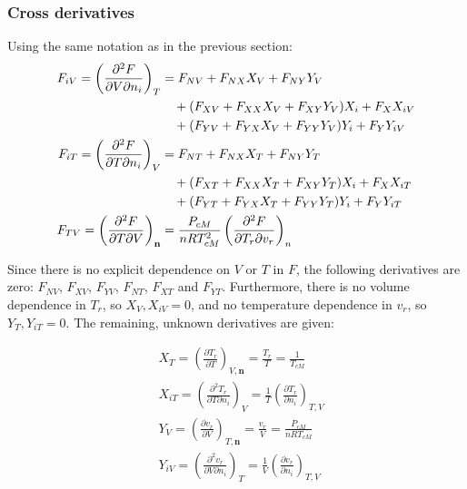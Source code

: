 \documentclass[english]{../thermomemo/thermomemo}
\numberwithin{equation}{section}
\newcommand*{\pder}[2]{\left(\frac{\partial #1}{\partial #2}\right)}
\newcommand*{\pdcross}[3]{\left(\frac{\partial^2 #1}{\partial #2 \partial #3}\right)}
\begin{document}
\subsubsection*{Cross derivatives}
Using the same notation as in the previous section:
\begin{align}
  \phantom{F_{iV} = \pdcross{F}{V}{n_i}_{T}}
  \label{eq:F_iV}
  & \begin{aligned}
    \mathllap{F_{iV} = \pdcross{F}{V}{n_i}_{T}}
    & =  F_{NV} + F_{NX}X_{V} + F_{NY}Y_{V}  \\
    & \quad + (F_{X V} + F_{XX} X_{V} + F_{XY} Y_{V}) X_{i} + F_{X}X_{iV} \\
    & \quad + (F_{Y V} + F_{YX} X_{V} + F_{YY} Y_{V}) Y_{i} + F_{Y}Y_{iV}
  \end{aligned} \\
  \label{eq:F_iT}
  & \begin{aligned}
    \mathllap{F_{iT} = \pdcross{F}{T}{n_i}_{V}}
    & =  F_{NT} + F_{NX}X_{T} + F_{NY}Y_{T}  \\
    & \quad + (F_{X T} + F_{XX} X_{T} + F_{XY} Y_{T}) X_{i} + F_{X}X_{iT} \\
	& \quad + (F_{Y T} + F_{YX} X_{T} + F_{YY} Y_{T}) Y_{i} + F_{Y}Y_{iT}
  \end{aligned} \\
  \label{F_TV}
  & \begin{aligned}
    \mathllap{F_{TV} = \pdcross{F}{T}{V}_\textbf{n}}
    & = \frac{P_{cM}}{n R T_{cM}^2} \pdcross{F}{T_r}{v_r}_{n} 
  \end{aligned}
\end{align}

Since there is no explicit dependence on $V$ or $T$ in $F$, the following derivatives are zero: $F_{NV}$, $F_{X V}$, $F_{Y V}$, $F_{NT}$, $F_{X T}$ and $F_{Y T}$. Furthermore, there is no volume dependence in $T_r$, so $X_V , X_{iV} = 0$, and no temperature dependence in $v_r$, so $Y_T , Y_{iT} = 0$. The remaining, unknown derivatives are given:

\begin{align}
& X_T = \pder{T_r}{T}_{V,\textbf{n}} = \frac{T_r}{T} = \frac{1}{T_{cM}}\\
& X_{iT} = \pdcross{T_r}{T}{n_i}_{V} = \frac{1}{T} \pder{T_r}{n_i}_{T,V} \\
& Y_V = \pder{v_r}{V}_{T,\textbf{n}} = \frac{v_r}{V} = \frac{P_{cM}}{n R T_{cM}}\\
& Y_{iV} = \pdcross{v_r}{V}{n_i}_{T} = \frac{1}{V} \pder{v_r}{n_i}_{T,V} 
\end{align}
\end{document}
